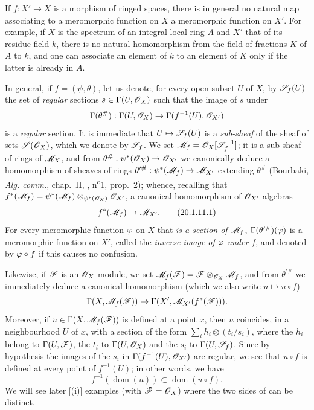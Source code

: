 \begin{env}[20.1.11]\label{IV.20.1.11}
If $f:X'\to X$ is a morphism of ringed spaces, there is in general no natural map associating to a meromorphic function on $X$ a meromorphic function on $X'$.
For example, if $X$ is the spectrum of an integral local ring $A$ and $X'$ that of its residue field $k$, there is no natural homomorphism from the field of fractions $K$ of $A$ to $k$, and one can associate an element of $k$ to an element of $K$ only if the latter is already in $A$.

In general, if $f=(\psi,\theta)$, let us denote, for every open subset $U$ of $X$, by $\mathscr{S}_f(U)$ the set of \emph{regular} sections $s\in\Gamma(U,\mathscr{O}_X)$ such that the image of $s$ under
\[
  \Gamma(\theta^\#):\Gamma(U,\mathscr{O}_X)\to\Gamma(f^{-1}(U),\mathscr{O}_{X'})
\]
is a \emph{regular} section.
It is immediate that $U\mapsto\mathscr{S}_f(U)$ is a \emph{sub-sheaf} of the sheaf of sets $\mathscr{S}(\mathscr{O}_X)$, which we denote by $\mathscr{S}_f$.
We set $\mathscr{M}_f=\mathscr{O}_X[\mathscr{S}_f^{-1}]$; it is a sub-sheaf
of rings of $\mathscr{M}_X$, and from $\theta^\#:\psi^*(\mathscr{O}_X)\to\mathscr{O}_{X'}$ we canonically deduce a homomorphism of sheaves of rings $\theta^{\prime\#}:\psi^*(\mathscr{M}_f)\to\mathscr{M}_{X'}$ extending $\theta^\#$ (Bourbaki, \emph{Alg. comm.}, chap.~II, , n\textsuperscript{o}1, prop.~2); whence, recalling that $f^*(\mathscr{M}_f)=\psi^*(\mathscr{M}_f)\otimes_{\psi^*(\mathscr{O}_X)}\mathscr{O}_{X'}$, a canonical homomorphism of $\mathscr{O}_{X'}$-algebras
\[
\label{IV.20.1.11.1}
  f^*(\mathscr{M}_f)\to\mathscr{M}_{X'}.
  \tag{20.1.11.1}
\]
For every meromorphic function $\varphi$ on $X$ that \emph{is a section of $\mathscr{M}_f$}, $\Gamma(\theta^{\prime\#})(\varphi)$ is a meromorphic function on $X'$, called the \emph{inverse image of $\varphi$ under $f$}, and denoted by $\varphi\circ f$ if this causes no confusion.

Likewise, if $\mathscr{F}$ is an $\mathscr{O}_X$-module, we set $\mathscr{M}_f(\mathscr{F})=\mathscr{F}\otimes_{\mathscr{O}_X}\mathscr{M}_f$, and from $\theta^{\prime\#}$ we immediately deduce a canonical homomorphism (which we also write $u\mapsto u\circ f$)
\[
  \Gamma(X,\mathscr{M}_f(\mathscr{F}))\to\Gamma(X',\mathscr{M}_{X'}(f^*(\mathscr{F}))).
\]
Moreover, if $u\in\Gamma(X,\mathscr{M}_f(\mathscr{F}))$ is defined  at a point $x$, then $u$ coincides, in a neighbourhood $U$ of $x$, with a section of the form $\sum_i h_i\otimes(t_i/s_i)$, where the $h_i$ belong to $\Gamma(U,\mathscr{F})$, the $t_i$ to $\Gamma(U,\mathscr{O}_X)$ and the $s_i$ to $\Gamma(U,\mathscr{S}_f)$.
Since by hypothesis the images of the $s_i$ in $\Gamma(f^{-1}(U),\mathscr{O}_{X'})$ are regular, we see that $u\circ f$ is defined at every point of $f^{-1}(U)$; in other words, we have
\[
\label{IV.20.1.11.2}
  f^{-1}(\operatorname{dom}(u))\subset\operatorname{dom}(u\circ f).
  \tag{20.1.11.2}
\]
We will see later [(i)] examples (with $\mathscr{F}=\mathscr{O}_X$) where the two sides of  can be distinct.


\end{env}
